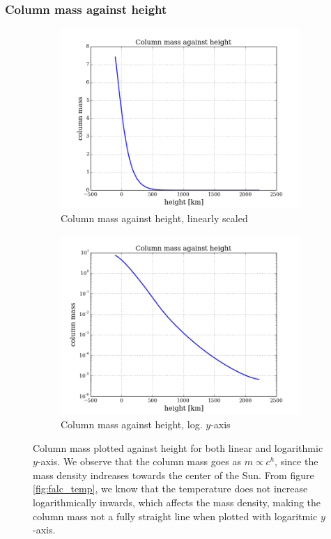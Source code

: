 \documentclass{article}
\begin{document}
\subsubsection{Column mass against height}
\begin{figure}[H]
  \centering
  \begin{subfigure}{0.49\textwidth}
    \includegraphics[scale=0.37]{../figures/falc/falc_h_colm_lin.png}
    \caption{Column mass against height, linearly scaled}
  \end{subfigure}
  \begin{subfigure}{0.49\textwidth}
    \includegraphics[scale=0.37]{../figures/falc/falc_h_colm_ylog.png}
    \caption{Column mass against height, log. $y$-axis}
  \end{subfigure}
  \caption{Column mass plotted against height for both linear and logarithmic $y$-axis. We observe that the column mass goes as $m\propto c^h$, since the mass density indreases towards the center of the Sun. From figure \ref{fig:falc_temp}, we know that the temperature does not increase logarithmically inwards, which affects the mass density, making the column mass not a fully straight line when plotted with logaritmic $y$-axis.}
\end{figure}
\end{document}
